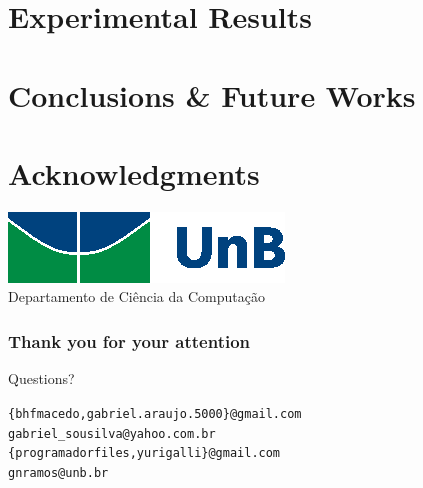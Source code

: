\documentclass{UnBeamer}%
\begin{document}
\section{Experimental Results}%
\begin{frame}%

\end{frame}%

\section{Conclusions \& Future Works}%
\begin{frame}%

\end{frame}%

\section{Acknowledgments}%
\begin{frame}%
	\begin{center}%
		\includegraphics[width=.6\textwidth]{img/beamer/as_bas_cor}%
		\\\large \textcolor{blueUnB}{Departamento de Ci\^{e}ncia da Computa\c{c}\~{a}o}%
	\end{center}%
\end{frame}%

\begin{frame}%
	\frametitle{Thank you for your attention}%

	\begin{center}%
		\Huge Questions?
	\end{center}%
	\vfill
	\texttt{\{bhfmacedo,gabriel.araujo.5000\}@gmail.com\\
		gabriel\_sousilva@yahoo.com.br\\
		\{programadorfiles,yurigalli\}@gmail.com\\
		gnramos@unb.br}%
\end{frame}%
\end{document}
